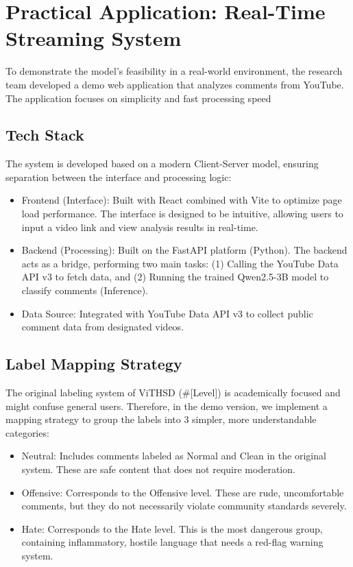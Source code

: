 \documentclass[11pt]{article}
\begin{document}
\section{Practical Application: Real-Time Streaming System}
To demonstrate the model's feasibility in a real-world environment, the research team
developed a demo web application that analyzes comments from YouTube. The application
focuses on simplicity and fast processing speed

\subsection{Tech Stack}
The system is developed based on a modern Client-Server model, ensuring separation
between the interface and processing logic:
\begin{itemize}[leftmargin=*]
\item Frontend (Interface): Built with React combined with Vite to optimize page load
performance. The interface is designed to be intuitive, allowing users to input a video
link and view analysis results in real-time.
\item Backend (Processing): Built on the FastAPI platform (Python). The backend acts as a
bridge, performing two main tasks: (1) Calling the YouTube Data API v3 to fetch data,
and (2) Running the trained Qwen2.5-3B model to classify comments (Inference).
\item Data Source: Integrated with YouTube Data API v3 to collect public comment data
from designated videos.
\end{itemize}

\subsection{Label Mapping Strategy}
The original labeling system of ViTHSD (\#[Level]) is academically focused and might confuse
general users. Therefore, in the demo version, we implement a mapping strategy to group the
labels into 3 simpler, more understandable categories:
\begin{itemize}[leftmargin=*]
\item Neutral: Includes comments labeled as Normal and Clean in the original system.
These are safe content that does not require moderation.
\item Offensive: Corresponds to the Offensive level. These are rude, uncomfortable
comments, but they do not necessarily violate community standards severely.
\item Hate: Corresponds to the Hate level. This is the most dangerous group, containing
inflammatory, hostile language that needs a red-flag warning system.
\end{itemize}
\end{document}
